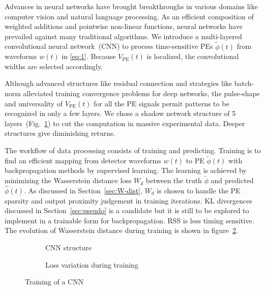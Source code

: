 Advances in neural networks have brought breakthroughs in various domains like computer vision and natural language processing. As an efficient composition of weighted additions and pointwise non-linear functions, neural networks have prevailed against many traditional algorithms. We introduce a multi-layered convolutional neural network~(CNN) to process time-sensitive PEs $\tilde{\phi}(t)$ from waveforms $w(t)$ in \eqref{eq:1}.  Because $V_\mathrm{PE}(t)$ is localized, the convolutional widths are selected accordingly.

Although advanced structures like residual connection and strategies like batch-norm alleviated training convergence problems for deep networks, the pulse-shape and universality of $V_\mathrm{PE}(t)$ for all the PE signals permit patterns to be recognized in only a few layers.  We chose a shadow network structure of 5 layers~(Fig.~\ref{fig:struct}) to cut the computation in massive experimental data.  Deeper structures give diminishing returns.

The workflow of data processing consists of training and predicting. Training is to find an efficient mapping from detector waveforms $w(t)$ to PE $\tilde{\phi}(t)$ with backpropagation methods by supervised learning.  The learning is achieved by minimizing the Wasserstein distance loss $W_d$ between the truth $\tilde{\phi}$ and predicted $\hat{\phi}(t)$.  As discussed in Section~\ref{sec:W-dist}, $W_d$ is chosen to handle the PE sparsity and output proximity judgement in training iterations.  KL divergences discussed in Section~\ref{sec:pseudo} is a candidate but it is still to be explored to implement in a trainable form for backpropagation.  RSS is less timing sensitive.  The evolution of Wasserstein distance during training is shown in figure~\ref{fig:loss}. 

\begin{figure}[H]
  \begin{subfigure}{0.35\textwidth}
    \centering
    \begin{adjustbox}{width=0.65\textwidth}
      
    \end{adjustbox}
    \caption{\label{fig:struct} CNN structure}
  \end{subfigure}
  \begin{subfigure}{0.6\textwidth}
    \centering
    \resizebox{\textwidth}{!}{}
    \caption{\label{fig:loss} Loss variation during training}
  \end{subfigure}
  \caption{\label{fig:CNN} Training of a CNN}
\end{figure}

